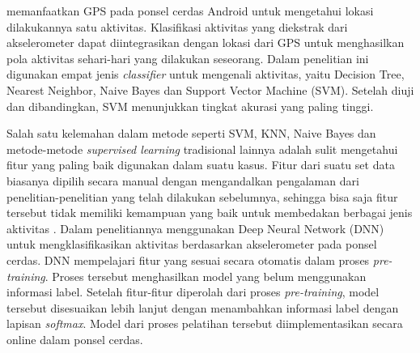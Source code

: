 \citet{Chiang-201413} memanfaatkan GPS pada ponsel cerdas Android untuk mengetahui lokasi dilakukannya satu aktivitas. Klasifikasi aktivitas yang diekstrak dari akselerometer dapat diintegrasikan dengan lokasi dari GPS untuk menghasilkan pola aktivitas sehari-hari yang dilakukan seseorang. Dalam penelitian ini digunakan empat jenis \textit{classifier} untuk mengenali aktivitas, yaitu Decision Tree, Nearest Neighbor, Naive Bayes dan Support Vector Machine (SVM). Setelah diuji dan dibandingkan, SVM menunjukkan tingkat akurasi yang paling tinggi.

Salah satu kelemahan dalam metode seperti SVM, KNN, Naive Bayes dan metode-metode \textit{supervised learning} tradisional lainnya adalah sulit mengetahui fitur yang paling baik digunakan dalam suatu kasus. Fitur dari suatu set data biasanya dipilih secara manual dengan mengandalkan pengalaman dari penelitian-penelitian yang telah dilakukan sebelumnya, sehingga bisa saja fitur tersebut tidak memiliki kemampuan yang baik untuk membedakan berbagai jenis aktivitas \citet{zhang-2015}. Dalam penelitiannya \citeauthor{zhang-2015} menggunakan Deep Neural Network (DNN) untuk mengklasifikasikan aktivitas berdasarkan akselerometer pada ponsel cerdas. DNN mempelajari fitur yang sesuai secara otomatis dalam proses \textit{pre-training}. Proses tersebut menghasilkan model yang belum menggunakan informasi label. Setelah fitur-fitur diperolah dari proses \textit{pre-training}, model tersebut disesuaikan lebih lanjut dengan menambahkan informasi label dengan lapisan \textit{softmax}. Model dari proses pelatihan tersebut diimplementasikan secara online dalam ponsel cerdas.

